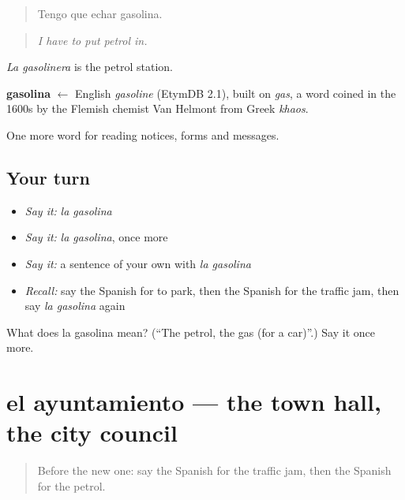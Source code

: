 \begin{quote}
Tengo que echar gasolina.
\end{quote}

\begin{quote}
\emph{I have to put petrol in.}
\end{quote}

\emph{La gasolinera} is the petrol station.

\begin{cousinweb}
\textbf{gasolina} $\leftarrow$ English \emph{gasoline} (EtymDB 2.1), built on \emph{gas}, a word coined in the 1600s by the Flemish chemist Van Helmont from Greek \emph{khaos}.
\end{cousinweb}

\begin{grammarlens}[title={What you've built}]
One more word for reading notices, forms and messages.
\end{grammarlens}

\subsection*{Your turn}
\begin{itemize}
\raggedright
  \item \emph{Say it:} \emph{la gasolina}
  \item \emph{Say it:} \emph{la gasolina}, once more
  \item \emph{Say it:} a sentence of your own with \emph{la gasolina}
  \item \emph{Recall:} say the Spanish for to park, then the Spanish for the traffic jam, then say \emph{la gasolina} again
\end{itemize}

\begin{tcolorbox}[breakable,colback=teal!4,colframe=teal!35!black,title={Before you move on}]
What does la gasolina mean? (\textquotedblleft{}The petrol, the gas (for a car)\textquotedblright{}.) Say it once more.
\end{tcolorbox}
\section[el ayuntamiento]{el ayuntamiento — the town hall, the city council}

\label{lesson:ES-C489-ayuntamiento}



\begin{quote}
Before the new one: say the Spanish for the traffic jam, then the Spanish for the petrol.
\end{quote}

